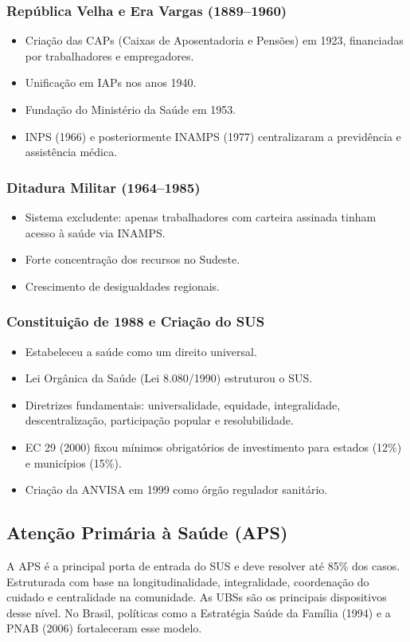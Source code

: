 \documentclass[a4paper,12pt]{article}
\begin{document}
\subsubsection{República Velha e Era Vargas (1889–1960)}
\label{sec:orgfaa8e35}
\begin{itemize}
\item Criação das CAPs (Caixas de Aposentadoria e Pensões) em 1923, financiadas por trabalhadores e empregadores.
\item Unificação em IAPs nos anos 1940.
\item Fundação do Ministério da Saúde em 1953.
\item INPS (1966) e posteriormente INAMPS (1977) centralizaram a previdência e assistência médica.
\end{itemize}
\subsubsection{Ditadura Militar (1964–1985)}
\label{sec:org7587a30}
\begin{itemize}
\item Sistema excludente: apenas trabalhadores com carteira assinada tinham acesso à saúde via INAMPS.
\item Forte concentração dos recursos no Sudeste.
\item Crescimento de desigualdades regionais.
\end{itemize}
\subsubsection{Constituição de 1988 e Criação do SUS}
\label{sec:org442e7a9}
\begin{itemize}
\item Estabeleceu a saúde como um direito universal.
\item Lei Orgânica da Saúde (Lei 8.080/1990) estruturou o SUS.
\item Diretrizes fundamentais: universalidade, equidade, integralidade, descentralização, participação popular e resolubilidade.
\item EC 29 (2000) fixou mínimos obrigatórios de investimento para estados (12\%) e municípios (15\%).
\item Criação da ANVISA em 1999 como órgão regulador sanitário.
\end{itemize}
\subsection{Atenção Primária à Saúde (APS)}
\label{sec:orgb1f7dae}
A APS é a principal porta de entrada do SUS e deve resolver até 85\% dos casos. Estruturada com base na longitudinalidade, integralidade, coordenação do cuidado e centralidade na comunidade. As UBSs são os principais dispositivos desse nível. No Brasil, políticas como a Estratégia Saúde da Família (1994) e a PNAB (2006) fortaleceram esse modelo.
\end{document}
